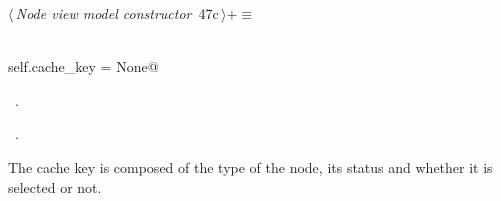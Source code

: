\documentclass[
    a4paper,      %
    10pt,         %
    openright,    %
    notitlepage,  %
    parskip=half, %
]{scrreprt}       %
\theoremstyle{definition}                    %
\begin{document}
\begin{flushleft} \small
\begin{minipage}{\linewidth}\label{scrap65}\raggedright\small
{} $\langle\,${\itshape Node view model constructor}\nobreak\ {\footnotesize {47c}}$\,\rangle+\equiv$
\vspace{-1ex}
\begin{list}{}{} \item
\mbox{}\lstinline@@\\
\mbox{}\lstinline@    self.cache_key = None@\\
\mbox{}\lstinline@@{\NWsep}
\end{list}
\vspace{-1.5ex}
\footnotesize
\begin{list}{}{\setlength{\itemsep}{-\parsep}\setlength{\itemindent}{-\leftmargin}}
\item \NWtxtMacroDefBy\ .
\item \NWtxtMacroRefIn\ .

\item{}
\end{list}
\end{minipage}\vspace{4ex}
\end{flushleft}
The cache key is composed of the type of the node, its status and whether it is
selected or not.
\end{document}
